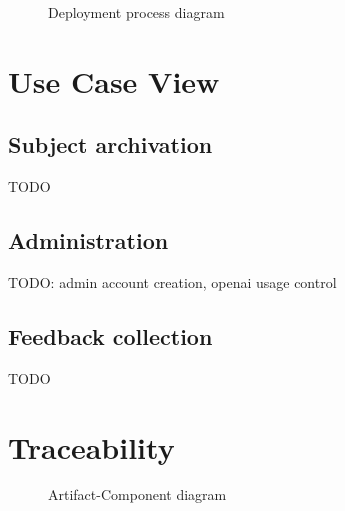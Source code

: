 \documentclass[
    english, %
]{VUMIFPSkursinis}
\begin{document}
\begin{figure}[ht]
    \centering
    
    \caption{Deployment process diagram}
    \label{deployment-process-diagram}
\end{figure}

\section{Use Case View}

\subsection{Subject archivation}

TODO

\subsection{Administration}

TODO: admin account creation, openai usage control

\subsection{Feedback collection}

TODO

\section{Traceability}

\begin{figure}[ht]
    \centering
    
    \caption{Artifact-Component diagram}
    \label{artifact-diagram}
\end{figure}

\newlength{\tablewidth}
\setlength{\tablewidth}{0.5\textwidth}


\renewcommand{\thead}[1]{\bfseries\makecell{#1}}
\end{document}

